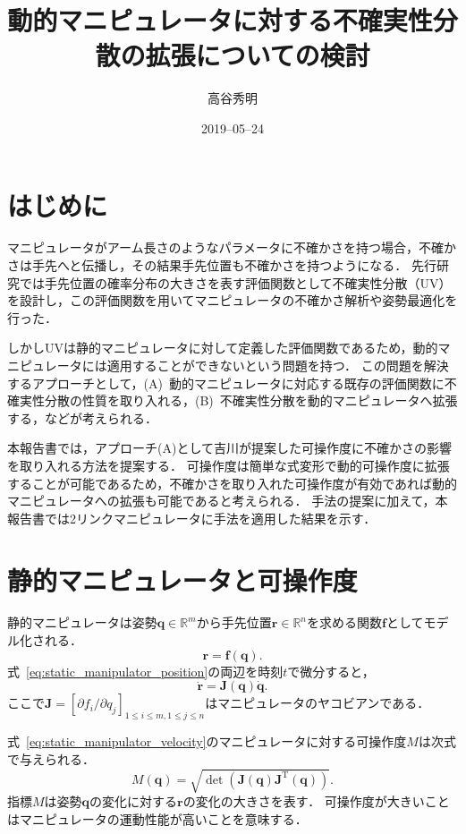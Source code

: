 \documentclass[10pt,a4j,twocolumn]{ltjsarticle}
\title{動的マニピュレータに対する不確実性分散の拡張についての検討} %
\author{高谷秀明}                              %
\date{2019--05--24}                              %
\begin{document}
\maketitle

\section{はじめに}

マニピュレータがアーム長さのようなパラメータに不確かさを持つ場合，不確かさは手先へと伝播し，その結果手先位置も不確かさを持つようになる．
先行研究では手先位置の確率分布の大きさを表す評価関数として不確実性分散（UV）を設計し，この評価関数を用いてマニピュレータの不確かさ解析や姿勢最適化を行った．

しかしUVは静的マニピュレータに対して定義した評価関数であるため，動的マニピュレータには適用することができないという問題を持つ．
この問題を解決するアプローチとして，(A)~動的マニピュレータに対応する既存の評価関数に不確実性分散の性質を取り入れる，(B)~不確実性分散を動的マニピュレータへ拡張する，などが考えられる．

本報告書では，アプローチ(A)として吉川が提案した可操作度に不確かさの影響を取り入れる方法を提案する．
可操作度は簡単な式変形で動的可操作度に拡張することが可能であるため，不確かさを取り入れた可操作度が有効であれば動的マニピュレータへの拡張も可能であると考えられる．
手法の提案に加えて，本報告書では2リンクマニピュレータに手法を適用した結果を示す．

\section{静的マニピュレータと可操作度}

静的マニピュレータは姿勢$\bm{q} \in \mathbb{R}^{m}$から手先位置$\bm{r} \in \mathbb{R}^{n}$を求める関数$\bm{f}$としてモデル化される．
\begin{equation}
  \bm{r} = \bm{f}(\bm{q}). \label{eq:static_manipulator_position}
\end{equation}
式~\eqref{eq:static_manipulator_position}の両辺を時刻$t$で微分すると，
\begin{equation}
  \dot{\bm{r}} = \bm{J}(\bm{q}) \dot{\bm{q}}. \label{eq:static_manipulator_velocity}
\end{equation}
ここで$\bm{J} = [\partial f_{i} / \partial q_{j}]_{1 \leq i \leq m, 1 \leq j \leq n}$はマニピュレータのヤコビアンである．

式~\eqref{eq:static_manipulator_velocity}のマニピュレータに対する可操作度$M$は次式で与えられる．
\begin{equation}
  M(\bm{q}) = \sqrt{\det \left( \bm{J}(\bm{q}) \bm{J}^{\mathrm{T}}(\bm{q}) \right)}.
\end{equation}
指標$M$は姿勢$\bm{q}$の変化に対する$\bm{r}$の変化の大きさを表す．
可操作度が大きいことはマニピュレータの運動性能が高いことを意味する．
\end{document}

